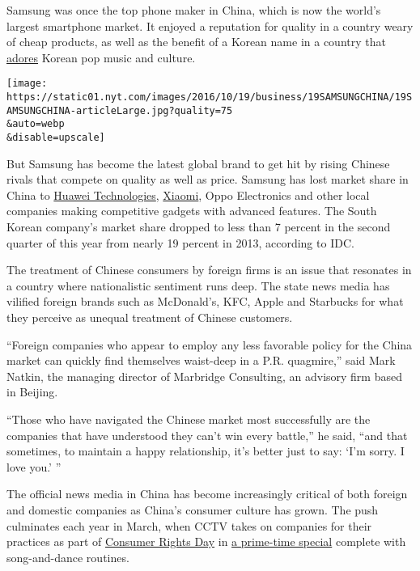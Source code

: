 Samsung was once the top phone maker in China, which is now the world's
largest smartphone market. It enjoyed a reputation for quality in a
country weary of cheap products, as well as the benefit of a Korean name
in a country that
\href{http://www.nytimes.com/2015/07/21/arts/television/chinas-love-affair-with-irresistible-korean-tv.html}{adores}
Korean pop music and culture.

\texttt{[image: https://static01.nyt.com/images/2016/10/19/business/19SAMSUNGCHINA/19SAMSUNGCHINA-articleLarge.jpg?quality=75\\\&auto=webp\\\&disable=upscale]}

But Samsung has become the latest global brand to get hit by rising
Chinese rivals that compete on quality as well as price. Samsung has
lost market share in China to
\href{http://bits.blogs.nytimes.com/2014/05/07/huawei-unveils-new-phone-to-compete-with-apple-and-samsung/}{Huawei
Technologies},
\href{http://www.nytimes.com/2014/12/15/technology/the-rise-of-a-new-smartphone-giant-chinas-xiaomi.html}{Xiaomi},
Oppo Electronics and other local companies making competitive gadgets
with advanced features. The South Korean company's market share dropped
to less than 7 percent in the second quarter of this year from nearly 19
percent in 2013, according to IDC.

The treatment of Chinese consumers by foreign firms is an issue that
resonates in a country where nationalistic sentiment runs deep. The
state news media has vilified foreign brands such as McDonald's, KFC,
Apple and Starbucks for what they perceive as unequal treatment of
Chinese customers.

``Foreign companies who appear to employ any less favorable policy for
the China market can quickly find themselves waist-deep in a P.R.
quagmire,'' said Mark Natkin, the managing director of Marbridge
Consulting, an advisory firm based in Beijing.

``Those who have navigated the Chinese market most successfully are the
companies that have understood they can't win every battle,'' he said,
``and that sometimes, to maintain a happy relationship, it's better just
to say: `I'm sorry. I love you.' ''

The official news media in China has become increasingly critical of
both foreign and domestic companies as China's consumer culture has
grown. The push culminates each year in March, when CCTV takes on
companies for their practices as part of
\href{http://www.consumersinternational.org/our-work/wcrd/about-wcrd/}{Consumer
Rights Day} in
\href{http://english.cntv.cn/2015/03/16/VIDE1426482244132567.shtml}{a
prime-time special} complete with song-and-dance routines.

